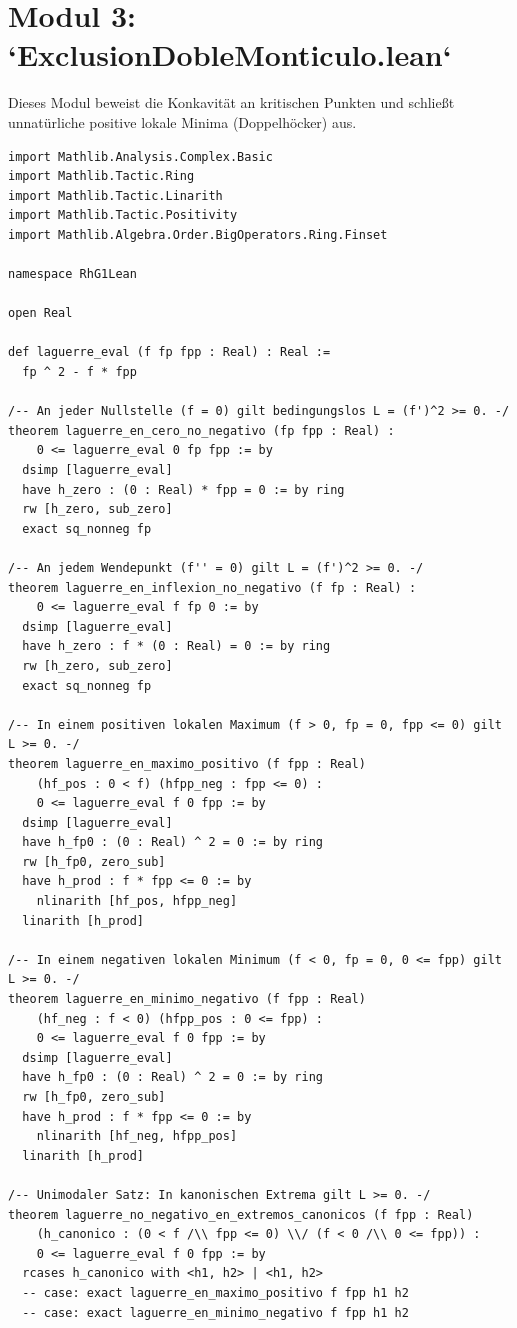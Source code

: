 \documentclass[11pt,a4paper]{article}
\theoremstyle{definition}
\theoremstyle{remark}
\begin{document}
\section{Modul 3: `ExclusionDobleMonticulo.lean`}

Dieses Modul beweist die Konkavität an kritischen Punkten und schließt unnatürliche positive lokale Minima (Doppelhöcker) aus.

\begin{lstlisting}[language=Lean4]
import Mathlib.Analysis.Complex.Basic
import Mathlib.Tactic.Ring
import Mathlib.Tactic.Linarith
import Mathlib.Tactic.Positivity
import Mathlib.Algebra.Order.BigOperators.Ring.Finset

namespace RhG1Lean

open Real

def laguerre_eval (f fp fpp : Real) : Real :=
  fp ^ 2 - f * fpp

/-- An jeder Nullstelle (f = 0) gilt bedingungslos L = (f')^2 >= 0. -/
theorem laguerre_en_cero_no_negativo (fp fpp : Real) :
    0 <= laguerre_eval 0 fp fpp := by
  dsimp [laguerre_eval]
  have h_zero : (0 : Real) * fpp = 0 := by ring
  rw [h_zero, sub_zero]
  exact sq_nonneg fp

/-- An jedem Wendepunkt (f'' = 0) gilt L = (f')^2 >= 0. -/
theorem laguerre_en_inflexion_no_negativo (f fp : Real) :
    0 <= laguerre_eval f fp 0 := by
  dsimp [laguerre_eval]
  have h_zero : f * (0 : Real) = 0 := by ring
  rw [h_zero, sub_zero]
  exact sq_nonneg fp

/-- In einem positiven lokalen Maximum (f > 0, fp = 0, fpp <= 0) gilt L >= 0. -/
theorem laguerre_en_maximo_positivo (f fpp : Real)
    (hf_pos : 0 < f) (hfpp_neg : fpp <= 0) :
    0 <= laguerre_eval f 0 fpp := by
  dsimp [laguerre_eval]
  have h_fp0 : (0 : Real) ^ 2 = 0 := by ring
  rw [h_fp0, zero_sub]
  have h_prod : f * fpp <= 0 := by
    nlinarith [hf_pos, hfpp_neg]
  linarith [h_prod]

/-- In einem negativen lokalen Minimum (f < 0, fp = 0, 0 <= fpp) gilt L >= 0. -/
theorem laguerre_en_minimo_negativo (f fpp : Real)
    (hf_neg : f < 0) (hfpp_pos : 0 <= fpp) :
    0 <= laguerre_eval f 0 fpp := by
  dsimp [laguerre_eval]
  have h_fp0 : (0 : Real) ^ 2 = 0 := by ring
  rw [h_fp0, zero_sub]
  have h_prod : f * fpp <= 0 := by
    nlinarith [hf_neg, hfpp_pos]
  linarith [h_prod]

/-- Unimodaler Satz: In kanonischen Extrema gilt L >= 0. -/
theorem laguerre_no_negativo_en_extremos_canonicos (f fpp : Real)
    (h_canonico : (0 < f /\\ fpp <= 0) \\/ (f < 0 /\\ 0 <= fpp)) :
    0 <= laguerre_eval f 0 fpp := by
  rcases h_canonico with <h1, h2> | <h1, h2>
  -- case: exact laguerre_en_maximo_positivo f fpp h1 h2
  -- case: exact laguerre_en_minimo_negativo f fpp h1 h2


\end{lstlisting}
\end{document}
